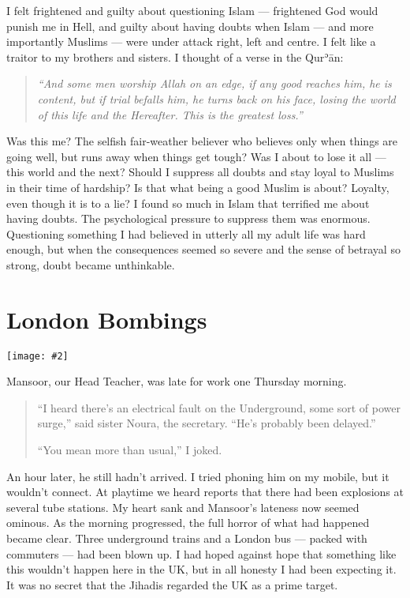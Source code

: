 \documentclass[12pt]{memoir}
\def\´{ʾ} %
\def \Quran{Qur\-\´ān} %
\newcommand{\img}[3]{\begin{center}%
\texttt{[image: \#2]}\\{\small\em#3}%
\end{center}}
\begin{document}
I felt frightened and guilty about questioning Islam —
frightened God would punish me in Hell,
and guilty about having doubts when Islam —
and more importantly Muslims — were under attack right, left and centre.
I felt like a traitor to my brothers and sisters.
I thought of a verse in the \Quran:

\begin{quote}
\emph{“And some men worship Allah on an edge, if any good reaches him,
he is content, but if trial befalls him, he turns back on his face,
losing the world of this life and the Hereafter.
This is the greatest loss.”}
\end{quote}

Was this me? The selfish fair-weather believer who believes only
when things are going well, but runs away when things get tough?
Was I about to lose it all — this world and the next?
Should I suppress all doubts and stay loyal to Muslims
in their time of hardship?
Is that what being a good Muslim is about?
Loyalty, even though it is to a lie?
I found so much in Islam that terrified me about having doubts.
The psychological pressure to suppress them was enormous.
Questioning something I had believed in utterly
all my adult life was hard enough,
but when the consequences seemed so severe
and the sense of betrayal so strong, doubt became unthinkable.



\chapter{London Bombings}

\img{scale=1.2}{London_Bombings.jpg}{}

Mansoor, our Head Teacher, was late for work one Thursday morning.

\begin{quote}
“I heard there’s an electrical fault on the Underground,
some sort of power surge,” said sister Noura, the secretary.
“He’s probably been delayed.”

“You mean more than usual,” I joked.
\end{quote}

An hour later, he still hadn’t arrived.
I tried phoning him on my mobile, but it wouldn’t connect.
At playtime we heard reports
that there had been explosions at several tube stations.
My heart sank and Mansoor’s lateness now seemed ominous.
As the morning progressed, the full horror of what had happened became clear.
Three underground trains and a London bus —
packed with commuters — had been blown up.
I had hoped against hope that something like this
wouldn’t happen here in the UK, but in all honesty I had been expecting it.
It was no secret that the Jihadis regarded the UK as a prime target.
\end{document}
